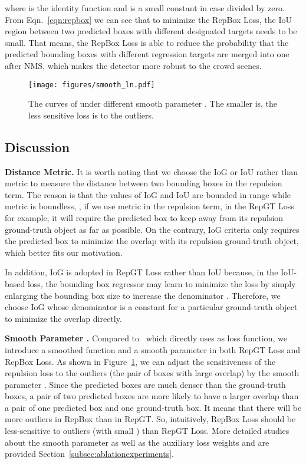 \documentclass[10pt,twocolumn,letterpaper]{article}
\newcommand{\myparagraph}[1]{{\vspace{0.5em} \noindent \bf #1}}
\begin{document}
where  is the identity function and  is a small constant in case divided by zero. From Eqn.~\ref{eqn:repbox} we can see that to minimize the RepBox Loss, the IoU region between two predicted boxes with different designated targets needs to be small. That means, the RepBox Loss is able to reduce the probability that the predicted bounding boxes with different regression targets are merged into one after NMS, which makes the detector more robust to the crowd scenes.

\begin{figure}[t]
\centering
\texttt{[image: figures/smooth\_ln.pdf]}
\caption{The curves of  under different smooth parameter . The smaller  is, the less sensitive loss is to the outliers.}
\vspace{-0.2cm}
\label{fig:smoothparam}
\end{figure}

\subsection{Discussion}
\myparagraph{Distance Metric.} It is worth noting that we choose the IoG or IoU rather than  metric to measure the distance between two bounding boxes in the repulsion term. The reason is that the values of IoG and IoU are bounded in range  while  metric is boundless, \ie, if we use  metric in the repulsion term, in the RepGT Loss for example, it will require the predicted box to keep away from its repulsion ground-truth object as far as possible. On the contrary, IoG criteria only requires the predicted box to minimize the overlap with its repulsion ground-truth object, which better fits our motivation.

In addition, IoG is adopted in RepGT Loss rather than IoU because, in the IoU-based loss, the bounding box regressor may learn to minimize the loss by simply enlarging the bounding box size to increase the denominator . Therefore, we choose IoG whose denominator is a constant for a particular ground-truth object to minimize the overlap  directly.


\myparagraph{Smooth Parameter .}
Compared to~\cite{yu2016unitbox} which directly uses  as loss function, we introduce a smoothed  function  and a smooth parameter  in both RepGT Loss and RepBox Loss. As shown in Figure~\ref{fig:smoothparam}, we can adjust the sensitiveness of the repulsion loss to the outliers (the pair of boxes with large overlap) by the smooth parameter . Since the predicted boxes are much denser than the ground-truth boxes, a pair of two predicted boxes are more likely to have a larger overlap than a pair of one predicted box and one ground-truth box. It means that there will be more outliers in RepBox than in RepGT. So, intuitively, RepBox Loss should be less-sensitive to outliers (with small ) than RepGT Loss. More detailed studies about the smooth parameter  as well as the auxiliary loss weights  and  are provided Section~\ref{subsec:ablationexperiments}.
\end{document}
